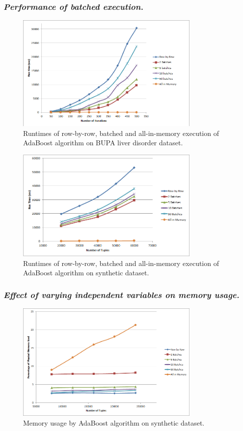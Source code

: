 \subsubsection*{\itshape Performance of batched execution.}
\begin{figure}[ht]
\centering
\includegraphics[width=0.8\textwidth]{ada2.png}
\caption{Runtimes of row-by-row, batched and all-in-memory execution of AdaBoost algorithm on BUPA liver disorder dataset.}
\label{fig:adabatch1}
\end{figure}

\begin{figure}[ht]
\centering
\includegraphics[width=0.8\textwidth]{ada3.png}
\caption{Runtimes of row-by-row, batched and all-in-memory execution of AdaBoost algorithm on synthetic dataset.}
\label{fig:adabatch2}
\end{figure}

\subsubsection*{\itshape Effect of varying independent variables on memory usage.}
\begin{figure}[ht]
\centering
\includegraphics[width=0.8\textwidth]{ada4.png}
\caption{Memory usage by AdaBoost algorithm on synthetic dataset.}
\label{fig:adamem}
\end{figure}
